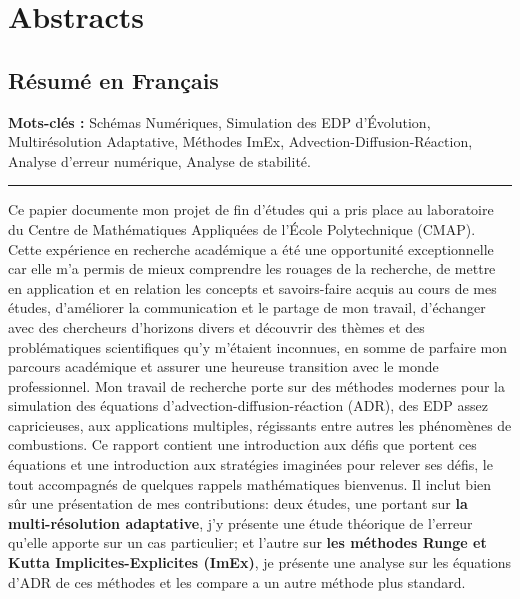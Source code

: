 \section*{Abstracts}
\subsection*{Résumé en Français}
    \textbf{Mots-clés :} Schémas Numériques, Simulation des EDP d'Évolution, Multirésolution Adaptative, Méthodes ImEx, 
    Advection-Diffusion-Réaction, Analyse d'erreur numérique, Analyse de stabilité.\par
    \noindent\rule{\textwidth}{0.4pt}
    Ce papier documente mon projet de fin d'études qui a pris place au laboratoire du Centre de Mathématiques Appliquées de l'École Polytechnique (CMAP).
    Cette expérience en recherche académique a été une opportunité exceptionnelle car elle m'a permis de mieux comprendre les rouages de la recherche,
    de mettre en application et en relation les concepts et savoirs-faire acquis au cours de mes études, d'améliorer la communication et le partage de mon travail,
    d'échanger avec des chercheurs d'horizons divers
    et découvrir des thèmes et des problématiques scientifiques qu'y m'étaient inconnues, en somme de parfaire mon parcours académique et assurer une heureuse transition avec le monde professionnel.
    Mon travail de recherche porte sur des méthodes modernes pour la simulation des équations d'advection-diffusion-réaction (ADR), des EDP assez capricieuses,
    aux applications multiples, régissants entre autres les phénomènes de combustions. Ce rapport contient une introduction aux défis que portent ces équations et 
    une introduction aux stratégies imaginées pour relever ses défis, le tout accompagnés de quelques rappels mathématiques bienvenus.
    Il inclut bien sûr une présentation de mes contributions: deux études, une portant sur \textbf{la multi-résolution adaptative},
    j'y présente une étude théorique de l'erreur qu'elle apporte sur un cas particulier;
    et l'autre sur \textbf{les méthodes Runge et Kutta Implicites-Explicites (ImEx)},
    je présente une analyse sur les équations d'ADR de ces méthodes et les compare a un autre méthode plus standard. 
